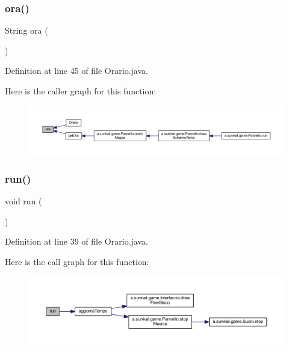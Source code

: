 \subsubsection{\texorpdfstring{ora()}{ora()}}
{\footnotesize\ttfamily String ora (\begin{DoxyParamCaption}{ }\end{DoxyParamCaption})}



Definition at line 45 of file Orario.\+java.

Here is the caller graph for this function\+:
\nopagebreak
\begin{figure}[H]
\begin{center}
\leavevmode
\includegraphics[width=350pt]{classa_1_1survival_1_1game_1_1_orario_a5dbecc8b3d698dae712952c4b30a4699_icgraph}
\end{center}
\end{figure}
\mbox{\label{classa_1_1survival_1_1game_1_1_orario_a13a43e6d814de94978c515cb084873b1}} 
\subsubsection{\texorpdfstring{run()}{run()}}
{\footnotesize\ttfamily void run (\begin{DoxyParamCaption}{ }\end{DoxyParamCaption})}



Definition at line 39 of file Orario.\+java.

Here is the call graph for this function\+:
\nopagebreak
\begin{figure}[H]
\begin{center}
\leavevmode
\includegraphics[width=350pt]{classa_1_1survival_1_1game_1_1_orario_a13a43e6d814de94978c515cb084873b1_cgraph}
\end{center}
\end{figure}


